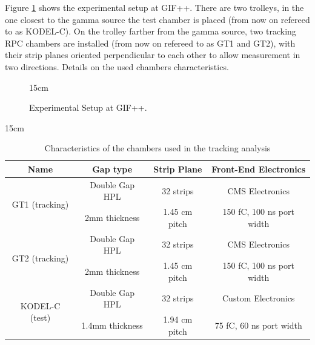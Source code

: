Figure \ref{fig:GIF_setup} shows the experimental setup at GIF++. There are two trolleys, in the one closest to the gamma source the test chamber is placed (from now on refereed to as KODEL-C). On the trolley farther from the gamma source, two tracking RPC chambers are installed (from now on refereed to as GT1 and GT2), with their strip planes oriented perpendicular to each other to allow measurement in two directions. Details on the used chambers characteristics.

\begin{figure}[!htm]{15cm}
\caption{Experimental Setup at GIF++.}%
\label{fig:GIF_setup}
\end{figure}

\begin{table}[!htbp]{15cm}
\caption{Characteristics of the chambers used in the tracking analysis}\label{tab:RPCchar}
\begin{tabular}{|c|c|c|c|}
    \hline
    Name & Gap type & Strip Plane & Front-End Electronics \\
    \hline
    \multirow{2}{*}{GT1 (tracking)} & Double Gap HPL & 32 strips & CMS Electronics \\ 
     & 2mm thickness & 1.45 cm pitch & 150 fC, 100 ns port width \\
    \hline
    \multirow{2}{*}{GT2 (tracking)} & Double Gap HPL & 32 strips & CMS Electronics \\ 
     & 2mm thickness & 1.45 cm pitch & 150 fC, 100 ns port width \\
    \hline
    \multirow{2}{*}{KODEL-C (test)} & Double Gap HPL & 32 strips & Custom Electronics \\ 
     & 1.4mm thickness & 1.94 cm pitch & 75 fC, 60 ns port width \\
    \hline
\end{tabular}
\end{table}

